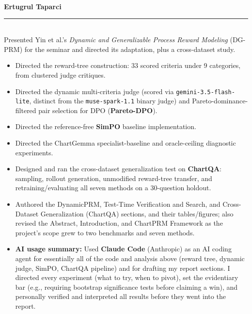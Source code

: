 \documentclass[11pt]{article}
\newcommand{\contribhead}[2]{%
  {\bfseries\color{accent}\large #1\ #2}\\[1pt]
  {\color{accent}\rule{\linewidth}{1.1pt}}\\[4pt]%
}
\begin{document}
\begin{minipage}[t]{0.485\textwidth}
\contribhead{Ertugrul Taparci}{}
\small
Presented Yin et al.'s \textit{Dynamic and Generalizable Process Reward Modeling} (DG-PRM) for the seminar and directed its adaptation, plus a cross-dataset study.
\begin{itemize}
  \item Directed the reward-tree construction: 33 scored criteria under 9 categories, from clustered judge critiques.
  \item Directed the dynamic multi-criteria judge (scored via \texttt{gemini-3.5-flash-lite}, distinct from the \texttt{muse-spark-1.1} binary judge) and Pareto-dominance-filtered pair selection for DPO (\textbf{Pareto-DPO}).
  \item Directed the reference-free \textbf{SimPO} baseline implementation.
  \item Directed the ChartGemma specialist-baseline and oracle-ceiling diagnostic experiments.
  \item Designed and ran the cross-dataset generalization test on \textbf{ChartQA}: sampling, rollout generation, unmodified reward-tree transfer, and retraining/evaluating all seven methods on a 30-question holdout.
  \item Authored the DynamicPRM, Test-Time Verification and Search, and Cross-Dataset Generalization (ChartQA) sections, and their tables/figures; also revised the Abstract, Introduction, and ChartPRM Framework as the project's scope grew to two benchmarks and seven methods.
  \item \textbf{AI usage summary:} Used \textbf{Claude Code} (Anthropic) as an AI coding agent for essentially all of the code and analysis above (reward tree, dynamic judge, SimPO, ChartQA pipeline) and for drafting my report sections. I directed every experiment (what to try, when to pivot), set the evidentiary bar (e.g., requiring bootstrap significance tests before claiming a win), and personally verified and interpreted all results before they went into the report.
\end{itemize}
\end{minipage}

\vspace{1.1em}
\end{document}
